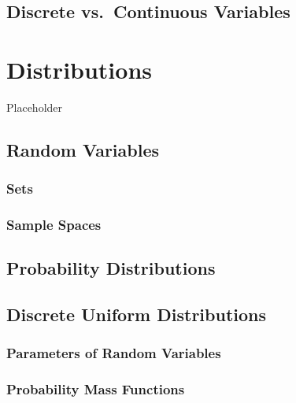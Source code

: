 \documentclass[
]{book}
\begin{document}
\hypertarget{sec:DiscreteVsContinuous}{%
\section{Discrete vs.~Continuous Variables}\label{sec:DiscreteVsContinuous}}

\hypertarget{distributions}{%
\chapter{Distributions}\label{distributions}}

Placeholder

\hypertarget{random-variables}{%
\section{Random Variables}\label{random-variables}}

\hypertarget{sets}{%
\subsection{Sets}\label{sets}}

\hypertarget{sec:SampleSpace}{%
\subsection{Sample Spaces}\label{sec:SampleSpace}}

\hypertarget{sec:ProbabilityDistribution}{%
\section{Probability Distributions}\label{sec:ProbabilityDistribution}}

\hypertarget{sec:DiscreteUniform}{%
\section{Discrete Uniform Distributions}\label{sec:DiscreteUniform}}

\hypertarget{parameters-of-random-variables}{%
\subsection{Parameters of Random Variables}\label{parameters-of-random-variables}}

\hypertarget{sec:pmf}{%
\subsection{Probability Mass Functions}\label{sec:pmf}}
\end{document}
